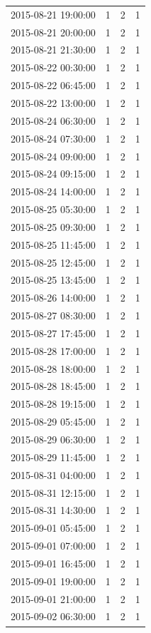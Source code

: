 \begin{tabular}{lrrr}
2015-08-21 19:00:00 & 1 & 2 & 1 \\
2015-08-21 20:00:00 & 1 & 2 & 1 \\
2015-08-21 21:30:00 & 1 & 2 & 1 \\
2015-08-22 00:30:00 & 1 & 2 & 1 \\
2015-08-22 06:45:00 & 1 & 2 & 1 \\
2015-08-22 13:00:00 & 1 & 2 & 1 \\
2015-08-24 06:30:00 & 1 & 2 & 1 \\
2015-08-24 07:30:00 & 1 & 2 & 1 \\
2015-08-24 09:00:00 & 1 & 2 & 1 \\
2015-08-24 09:15:00 & 1 & 2 & 1 \\
2015-08-24 14:00:00 & 1 & 2 & 1 \\
2015-08-25 05:30:00 & 1 & 2 & 1 \\
2015-08-25 09:30:00 & 1 & 2 & 1 \\
2015-08-25 11:45:00 & 1 & 2 & 1 \\
2015-08-25 12:45:00 & 1 & 2 & 1 \\
2015-08-25 13:45:00 & 1 & 2 & 1 \\
2015-08-26 14:00:00 & 1 & 2 & 1 \\
2015-08-27 08:30:00 & 1 & 2 & 1 \\
2015-08-27 17:45:00 & 1 & 2 & 1 \\
2015-08-28 17:00:00 & 1 & 2 & 1 \\
2015-08-28 18:00:00 & 1 & 2 & 1 \\
2015-08-28 18:45:00 & 1 & 2 & 1 \\
2015-08-28 19:15:00 & 1 & 2 & 1 \\
2015-08-29 05:45:00 & 1 & 2 & 1 \\
2015-08-29 06:30:00 & 1 & 2 & 1 \\
2015-08-29 11:45:00 & 1 & 2 & 1 \\
2015-08-31 04:00:00 & 1 & 2 & 1 \\
2015-08-31 12:15:00 & 1 & 2 & 1 \\
2015-08-31 14:30:00 & 1 & 2 & 1 \\
2015-09-01 05:45:00 & 1 & 2 & 1 \\
2015-09-01 07:00:00 & 1 & 2 & 1 \\
2015-09-01 16:45:00 & 1 & 2 & 1 \\
2015-09-01 19:00:00 & 1 & 2 & 1 \\
2015-09-01 21:00:00 & 1 & 2 & 1 \\
2015-09-02 06:30:00 & 1 & 2 & 1 \\

\end{tabular}
